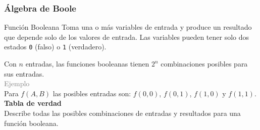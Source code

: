 \documentclass[aspectratio=169]{beamer}
\begin{document}
\begin{frame}[fragile]
    \frametitle{Álgebra de Boole}
    \begin{block}{Función Booleana}
    Toma una o más variables de entrada y produce un resultado que depende solo de los valores de entrada.
    Las variables pueden tener solo dos estados \texttt{0} (falso) o \texttt{1} (verdadero).
    \end{block}
    \pause
    Con $n$ entradas, las funciones booleanas tienen $2^n$ combinaciones posibles para sus entradas.\\
    \bigskip
    \textcolor{gray}{Ejemplo}\\
    Para $f(A,B)$ las posibles entradas son: \texttt{$f(0,0)$}, \texttt{$f(0,1)$}, \texttt{$f(1,0)$} y \texttt{$f(1,1)$}.\\
    \bigskip
    \textbf{Tabla de verdad}\\ Describe todas las posibles combinaciones de entradas y resultados para una función booleana.
\end{frame}
\end{document}
